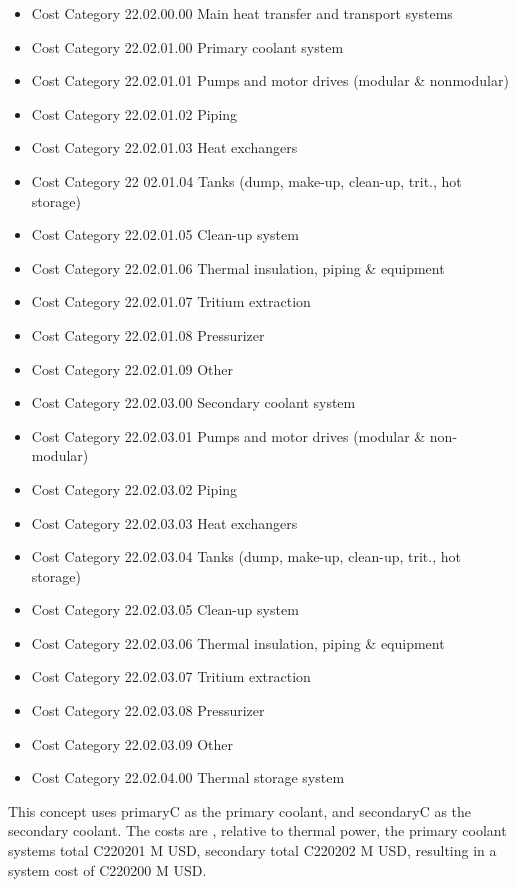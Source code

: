 \begin{itemize}
    \item Cost Category 22.02.00.00    Main heat transfer and transport systems
    \item Cost Category 22.02.01.00      Primary coolant system
    \item Cost Category 22.02.01.01        Pumps and  motor drives (modular \& nonmodular)
    \item Cost Category 22.02.01.02        Piping
    \item Cost Category 22.02.01.03        Heat exchangers
    \item Cost Category 22 02.01.04        Tanks (dump, make-up, clean-up, trit., hot storage)
    \item Cost Category 22.02.01.05        Clean-up system
    \item Cost Category 22.02.01.06        Thermal insulation, piping \& equipment
    \item Cost Category 22.02.01.07        Tritium extraction
    \item Cost Category 22.02.01.08        Pressurizer
    \item Cost Category 22.02.01.09        Other
    \item Cost Category 22.02.03.00      Secondary coolant system
    \item Cost Category 22.02.03.01        Pumps and motor drives (modular \& non-modular)
    \item Cost Category 22.02.03.02        Piping
    \item Cost Category 22.02.03.03        Heat exchangers
    \item Cost Category 22.02.03.04        Tanks (dump, make-up, clean-up, trit., hot storage)
    \item Cost Category 22.02.03.05        Clean-up system
    \item Cost Category 22.02.03.06        Thermal insulation, piping \& equipment
    \item Cost Category 22.02.03.07        Tritium extraction
    \item Cost Category 22.02.03.08        Pressurizer
    \item Cost Category 22.02.03.09        Other
    \item Cost Category 22.02.04.00      Thermal storage system
\end{itemize}


This concept uses primaryC as the primary coolant, and secondaryC as the secondary coolant.  The costs are , relative to thermal power, the primary coolant systems total C220201 M USD, secondary total C220202 M USD, resulting in a system cost of C220200 M USD.